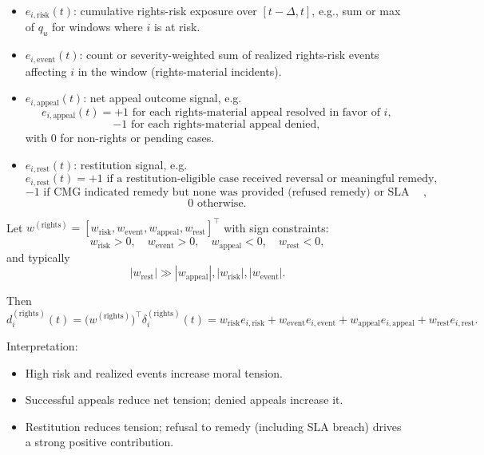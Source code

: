 \documentclass[11pt]{article}
\begin{document}
\begin{itemize}[leftmargin=*]
  \item \(e_{i,\text{risk}}(t)\): cumulative rights-risk exposure over \([t-\Delta, t]\), e.g., sum or max of \(q_u\) for windows where \(i\) is at risk.

  \item \(e_{i,\text{event}}(t)\): count or severity-weighted sum of realized rights-risk events affecting \(i\) in the window (rights-material incidents).

  \item \(e_{i,\text{appeal}}(t)\): net appeal outcome signal, e.g.
  \[
  e_{i,\text{appeal}}(t) =
  +1 \text{ for each rights-material appeal resolved in favor of } i,
  \]
  \[
  -1 \text{ for each rights-material appeal denied},
  \]
  with 0 for non-rights or pending cases.

  \item \(e_{i,\text{rest}}(t)\): restitution signal, e.g.
  \[
  e_{i,\text{rest}}(t) =
  +1 \text{ if a restitution-eligible case received reversal or meaningful remedy},
  \]
  \[
  -1 \text{ if CMG indicated remedy but none was provided (refused remedy) or SLA was breached},
  \]
  \[
  0 \text{ otherwise}.
  \]
\end{itemize}

Let \(w^{(\text{rights})} = [w_{\text{risk}}, w_{\text{event}}, w_{\text{appeal}}, w_{\text{rest}}]^\top\) with sign constraints:
\[
w_{\text{risk}} > 0,\quad w_{\text{event}} > 0,\quad
w_{\text{appeal}} < 0,\quad w_{\text{rest}} < 0,
\]
and typically
\[
|w_{\text{rest}}| \gg |w_{\text{appeal}}|, |w_{\text{risk}}|, |w_{\text{event}}|.
\]

Then
\[
d_i^{(\text{rights})}(t) = \big(w^{(\text{rights})}\big)^\top \delta_i^{(\text{rights})}(t)
= w_{\text{risk}} e_{i,\text{risk}} + w_{\text{event}} e_{i,\text{event}} + w_{\text{appeal}} e_{i,\text{appeal}} + w_{\text{rest}} e_{i,\text{rest}}.
\]

Interpretation:

\begin{itemize}[leftmargin=*]
  \item High risk and realized events increase moral tension.
  \item Successful appeals reduce net tension; denied appeals increase it.
  \item Restitution reduces tension; refusal to remedy (including SLA breach) drives a strong positive contribution.
\end{itemize}
\end{document}
